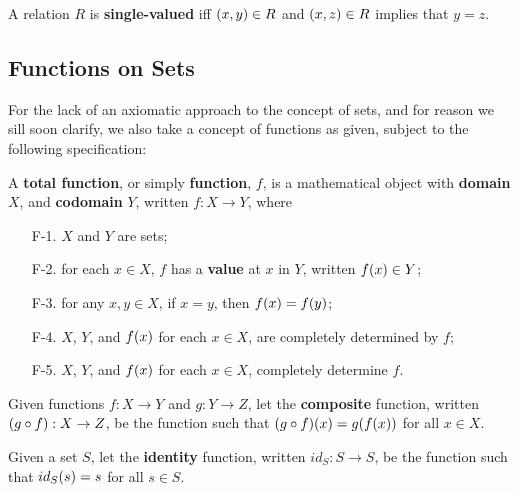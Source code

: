 \begin{definition} A relation $R$ is \textbf{single-valued} iff $\mathopen{}\left({x,y}\right)\mathclose{}\in R$
and $\mathopen{}\left({x,z}\right)\mathclose{}\in R$ implies that $y=z$. \end{definition}

\subsection{Functions on Sets}

For the lack of an axiomatic approach to the concept of sets, and for reason we
sill soon clarify, we also take a concept of functions as given, subject to the
following specification:

\begin{specification} A \textbf{total function}, or simply \textbf{function},
$f$, is a mathematical object with \textbf{domain} $X$, and \textbf{codomain}
$Y$, written $f:X\rightarrow Y$, where

\begin{enumerate}

\item [F-1.] $X$ and $Y$ are sets;

\item [F-2.] for each $x\in X$, $f$ has a \textbf{value} at $x$ in $Y$, written
$f\mathopen{}\left({x}\right)\mathclose{}\in Y$;

\item [F-3.] for any $x,y\in X$, if $x=y$, then $f\mathopen{}\left({x}\right)\mathclose{}=f\mathopen{}\left({y}\right)\mathclose{}$;

\item [F-4.] $X$, $Y$, and $f\mathopen{}\left({x}\right)\mathclose{}$ for each $x\in X$, are completely determined
by $f$;

\item [F-5.] $X$, $Y$, and $f\mathopen{}\left({x}\right)\mathclose{}$ for each $x\in X$, completely determine $f$.

\end{enumerate}

\end{specification}

\begin{definition} Given functions $f:X\rightarrow Y$ and $g:Y\rightarrow Z$,
let the \textbf{composite} function, written $\mathopen{}\left({g\circ f}\right)\mathclose{} : X \rightarrow Z$,
be the function such that $\mathopen{}\left({g\circ f}\right)\mathclose{}\mathopen{}\left({x}\right)\mathclose{}=g\mathopen{}\left({f\mathopen{}\left({x}\right)\mathclose{}}\right)\mathclose{}$ for all $x\in X$.
\end{definition}

\begin{definition} Given a set $S$, let the \textbf{identity} function, written
$id_S: S \rightarrow S$, be the function such that $id_S\mathopen{}\left({s}\right)\mathclose{}=s$ for all $s\in
S$. \end{definition}


